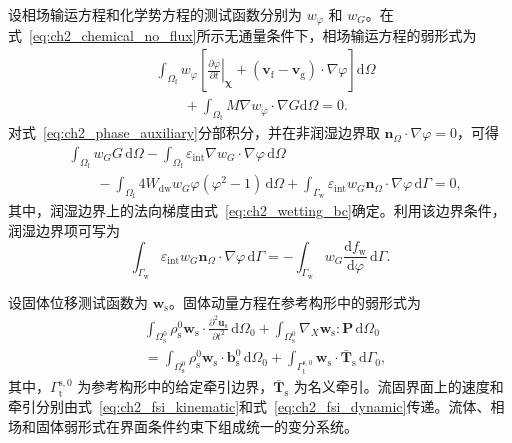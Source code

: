 设相场输运方程和化学势方程的测试函数分别为 $w_{\varphi}$ 和 $w_G$。在式~\eqref{eq:ch2_chemical_no_flux}所示无通量条件下，相场输运方程的弱形式为
\begin{equation}
\begin{aligned}
&\int_{\Omega_{\mathrm f}}
w_{\varphi}
\left[
\left.
\frac{\partial\varphi}{\partial t}
\right|_{\boldsymbol{\chi}}
+
\left(
\boldsymbol{v}_{\mathrm f}-\boldsymbol{v}_{\mathrm g}
\right)
\cdot\nabla\varphi
\right]
\mathrm d\Omega
\\
&\qquad
+
\int_{\Omega_{\mathrm f}}
M\nabla w_{\varphi}\cdot\nabla G
\mathrm d\Omega
=0.
\label{eq:ch2_weak_phase_transport}
\end{aligned}
\end{equation}
对式~\eqref{eq:ch2_phase_auxiliary}分部积分，并在非润湿边界取 $\boldsymbol{n}_{\Omega}\cdot\nabla\varphi=0$，可得
\begin{equation}
\begin{aligned}
&\int_{\Omega_{\mathrm f}}
w_GG\,\mathrm d\Omega
-
\int_{\Omega_{\mathrm f}}
\varepsilon_{\mathrm{int}}
\nabla w_G\cdot\nabla\varphi
\,\mathrm d\Omega
\\
&\qquad
-
\int_{\Omega_{\mathrm f}}
4W_{\mathrm{dw}}
w_G\varphi\left(\varphi^2-1\right)
\,\mathrm d\Omega
+
\int_{\Gamma_{\mathrm w}}
\varepsilon_{\mathrm{int}}
w_G
\boldsymbol{n}_{\Omega}\cdot\nabla\varphi
\,\mathrm d\Gamma
=0,
\label{eq:ch2_weak_phase_auxiliary}
\end{aligned}
\end{equation}
其中，润湿边界上的法向梯度由式~\eqref{eq:ch2_wetting_bc}确定。利用该边界条件，润湿边界项可写为
\begin{equation}
\int_{\Gamma_{\mathrm w}}
\varepsilon_{\mathrm{int}}
w_G
\boldsymbol{n}_{\Omega}\cdot\nabla\varphi
\,\mathrm d\Gamma
=
-
\int_{\Gamma_{\mathrm w}}
w_G
\frac{\mathrm d f_{\mathrm w}}{\mathrm d\varphi}
\,\mathrm d\Gamma.
\label{eq:ch2_weak_wetting_term}
\end{equation}

设固体位移测试函数为 $\boldsymbol{w}_{\mathrm s}$。固体动量方程在参考构形中的弱形式为
\begin{equation}
\begin{aligned}
&\int_{\Omega_{\mathrm s}^0}
\rho_{\mathrm s}^0
\boldsymbol{w}_{\mathrm s}\cdot
\frac{\partial^2\boldsymbol{u}_{\mathrm s}}{\partial t^2}
\,\mathrm d\Omega_0
+
\int_{\Omega_{\mathrm s}^0}
\nabla_{\!X}\boldsymbol{w}_{\mathrm s}:\boldsymbol{P}
\,\mathrm d\Omega_0
\\
&=
\int_{\Omega_{\mathrm s}^0}
\rho_{\mathrm s}^0
\boldsymbol{w}_{\mathrm s}\cdot\boldsymbol{b}_{\mathrm s}^0
\,\mathrm d\Omega_0
+
\int_{\Gamma_{\mathrm t}^{\mathrm s,0}}
\boldsymbol{w}_{\mathrm s}\cdot\bar{\boldsymbol{T}}_{\mathrm s}
\,\mathrm d\Gamma_0,
\label{eq:ch2_weak_solid}
\end{aligned}
\end{equation}
其中，$\Gamma_{\mathrm t}^{\mathrm s,0}$ 为参考构形中的给定牵引边界，$\bar{\boldsymbol{T}}_{\mathrm s}$ 为名义牵引。流固界面上的速度和牵引分别由式~\eqref{eq:ch2_fsi_kinematic}和式~\eqref{eq:ch2_fsi_dynamic}传递。流体、相场和固体弱形式在界面条件约束下组成统一的变分系统。

